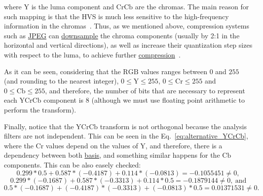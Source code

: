 \begin{comment}
\begin{equation}
  \begin{bmatrix}
    \text{Y} \\
    \text{Cr} \\
    \text{Cb}
  \end{bmatrix}
  =
  \begin{bmatrix}
    0.299   &   0.587 & 0.114 \\ 
    0.5     & -0.4187 & -0.0813 \\
    -0.1687 & -0.3313 & 0.5
  \end{bmatrix}
  \begin{bmatrix}
    \text{R} \\
    \text{G} \\
    \text{B}
  \end{bmatrix},
  \label{eq:YCrCb}
\end{equation}
\end{comment}
where $\text{Y}$ is the luma component and $\text{CrCb}$ are the
chromas. The main reason for such mapping is that the HVS is much less
sensitive to the high-frequency information in the
chromas~\cite{burger2016digital}. Thus, as we mentioned above,
compression systems such as
\href{https://en.wikipedia.org/wiki/JPEG}{JPEG} can
\href{https://en.wikipedia.org/wiki/Downsampling_(signal_processing)}{downsample}
the chroma components (usually by 2:1 in the horizontal and vertical
directions), as well as increase their quantization step sizes with
respect to the luma, to achieve further
\href{https://en.wikipedia.org/wiki/Data_compression_ratio}{compression}~\cite{malvar2008lifting}.

As it can be seen, considering that the $\text{RGB}$ values ranges
between $0$ and $255$ (and rounding to the nearest integer),
$0\le\text{Y}\le 255$, $0\le\text{Cr}\le 255$ and
$0\le\text{Cb}\le 255$, and therefore, the number of bits that are
necessary to represent each $\text{YCrCb}$ component is 8 (although we
must use floating point arithmetic to perform the transform).

Finally, notice that the $\text{YCrCb}$ transform is not orthogonal
because the analysis filters are not independent. This can be seen in
the Eq.~\ref{eq:alternative_YCrCb}, where the $\text{Cr}$ values
depend on the values of $\text{Y}$, and therefore, there is a
dependency between both
\href{https://en.wikipedia.org/wiki/Basis_(linear_algebra)}{basis},
and something similar happens for the $\text{Cb}$ components. This can
be also easely checked: $$0.299*0.5 + 0.587*(-0.4187) + 0.114*(-0.0813)
= -0.1055451 \neq 0,$$ $$0.299*(-0.1687) + 0.587*(-0.3313) + 0.114*0.5 =
-0.1879144 \neq 0,~\mathrm{and}$$ $$0.5*(-0.1687) + (-0.4187)*(-0.3313 ) +
(-0.0813)*0.5 = 0.01371531 \neq 0.$$

